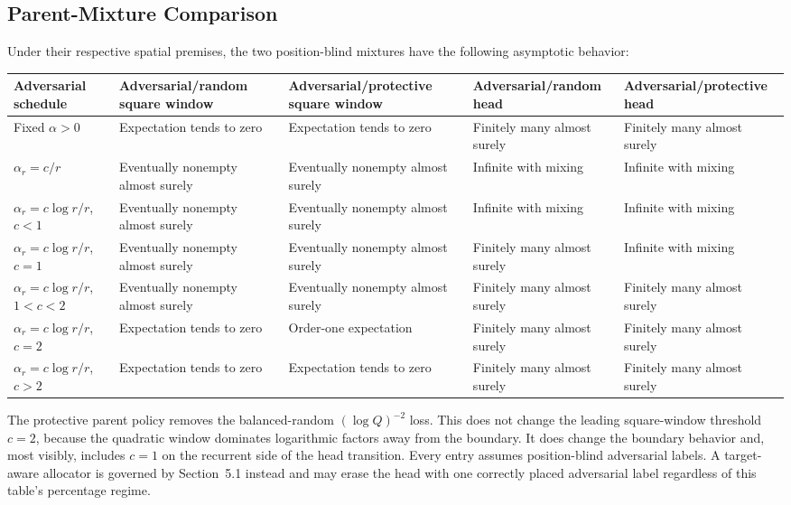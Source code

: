 \subsection{Parent-Mixture Comparison}
Under their respective spatial premises, the two position-blind mixtures have the following asymptotic behavior:
\begin{longtable}{@{}>{\raggedright\arraybackslash}p{}>{\raggedright\arraybackslash}p{}>{\raggedright\arraybackslash}p{}>{\raggedright\arraybackslash}p{}>{\raggedright\arraybackslash}p{}@{}}
\toprule
Adversarial schedule & Adversarial/\allowbreak random square window & Adversarial/\allowbreak protective square window & Adversarial/\allowbreak random head & Adversarial/\allowbreak protective head \\
\midrule
Fixed $\alpha > 0$ & Expectation tends to zero & Expectation tends to zero & Finitely many almost surely & Finitely many almost surely \\
$\alpha_r= c/r$ & Eventually nonempty almost surely & Eventually nonempty almost surely & Infinite with mixing & Infinite with mixing \\
$\alpha_r= c\log r/r$, $c < 1$ & Eventually nonempty almost surely & Eventually nonempty almost surely & Infinite with mixing & Infinite with mixing \\
$\alpha_r= c\log r/r$, $c=1$ & Eventually nonempty almost surely & Eventually nonempty almost surely & Finitely many almost surely & Infinite with mixing \\
$\alpha_r= c\log r/r$, $1 < c < 2$ & Eventually nonempty almost surely & Eventually nonempty almost surely & Finitely many almost surely & Finitely many almost surely \\
$\alpha_r= c\log r/r$, $c=2$ & Expectation tends to zero & Order-one expectation & Finitely many almost surely & Finitely many almost surely \\
$\alpha_r= c\log r/r$, $c > 2$ & Expectation tends to zero & Expectation tends to zero & Finitely many almost surely & Finitely many almost surely \\
\bottomrule
\end{longtable}
The protective parent policy removes the balanced-random $(\log Q)^{-2}$ loss. This does not change the leading square-window threshold $c=2$, because the quadratic window dominates logarithmic factors away from the boundary. It does change the boundary behavior and, most visibly, includes $c=1$ on the recurrent side of the head transition.
Every entry assumes position-blind adversarial labels. A target-aware allocator is governed by Section~5.1 instead and may erase the head with one correctly placed adversarial label regardless of this table's percentage regime.
